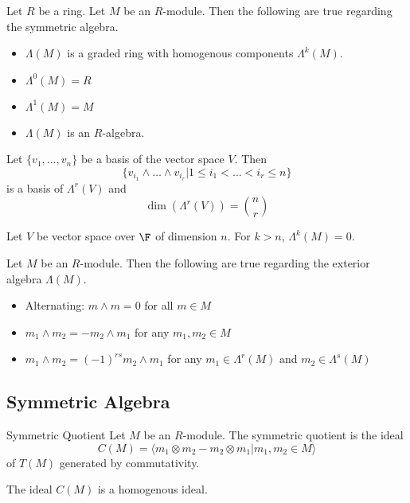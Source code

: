 \documentclass[a4paper]{article}
\begin{document}
\begin{prp}{}{} Let $R$ be a ring. Let $M$ be an $R$-module. Then the following are true regarding the symmetric algebra. 
\begin{itemize}
\item $\Lambda(M)$ is a graded ring with homogenous components $\Lambda^k(M)$. 
\item $\Lambda^0(M)=R$
\item $\Lambda^1(M)=M$
\item $\Lambda(M)$ is an $R$-algebra. 
\end{itemize}
\end{prp}

\begin{prp}{}{} Let $\{v_1,\dots,v_n\}$ be a basis of the vector space $V$. Then $$\{v_{i_1}\wedge\dots\wedge v_{i_r}|1\leq i_1<\dots<i_r\leq n\}$$ is a basis of $\Lambda^r(V)$ and $$\dim(\Lambda^r(V))=\binom{n}{r}$$
\end{prp}

\begin{crl}{}{} Let $V$ be vector space over $\F$ of dimension $n$. For $k>n$, $\Lambda^k(M)=0$. 
\end{crl}

\begin{lmm}{}{} Let $M$ be an $R$-module. Then the following are true regarding the exterior algebra $\Lambda(M)$. 
\begin{itemize}
\item Alternating: $m\wedge m=0$ for all $m\in M$
\item $m_1\wedge m_2=-m_2\wedge m_1$ for any $m_1,m_2\in M$
\item $m_1\wedge m_2=(-1)^{rs}m_2\wedge m_1$ for any $m_1\in\Lambda^r(M)$ and $m_2\in\Lambda^s(M)$
\end{itemize}
\end{lmm}

\subsection{Symmetric Algebra}
\begin{defn}{Symmetric Quotient}{} Let $M$ be an $R$-module. The symmetric quotient is the ideal $$C(M)=\langle m_1\otimes m_2-m_2\otimes m_1|m_1,m_2\in M\rangle$$ of $T(M)$ generated by commutativity. 
\end{defn}

\begin{lmm}{}{} The ideal $C(M)$ is a homogenous ideal. 
\end{lmm}
\end{document}
